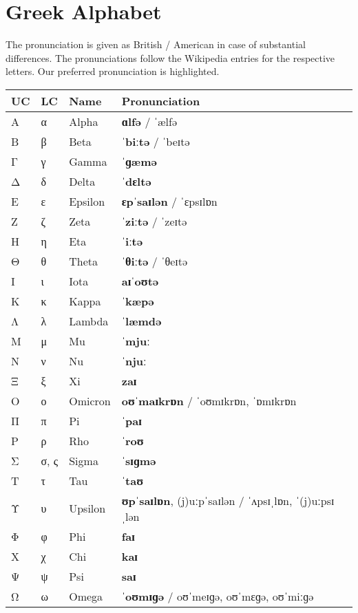 
\section*{Greek Alphabet}

The pronunciation is given as British / American in case of substantial differences.
The pronunciations follow the Wikipedia entries for the respective letters.
Our preferred pronunciation is highlighted.

\begin{center}
  \begin{tabular}{llll}
    \toprule
    \textbf{UC} & \textbf{LC} & \textbf{Name} & \textbf{Pronunciation} \\
    \midrule
    Α & α	   & Alpha   & \textbf{ɑlfə} / ˈælfə \\
    Β & β	   & Beta    & \textbf{ˈbiːtə} / ˈbeɪtə \\
    Γ & γ	   & Gamma   & \textbf{ˈɡæmə} \\
    Δ & δ	   & Delta   & \textbf{ˈdɛltə} \\
    Ε & ε	   & Epsilon & \textbf{ɛpˈsaɪlən} / ˈɛpsɪlɒn \\
    Ζ & ζ	   & Zeta    & \textbf{ˈziːtə} / ˈzeɪtə \\
    Η & η	   & Eta     & \textbf{ˈiːtə} \\
    Θ & θ	   & Theta   & \textbf{ˈθiːtə} / ˈθeɪtə \\
    Ι & ι	   & Iota    & \textbf{aɪˈoʊtə} \\
    Κ & κ	   & Kappa   & \textbf{ˈkæpə} \\
    Λ & λ	   & Lambda  & \textbf{ˈlæmdə} \\
    Μ & μ	   & Mu      & \textbf{ˈmjuː} \\
    Ν & ν	   & Nu      & \textbf{ˈnjuː} \\
    Ξ & ξ	   & Xi      & \textbf{zaɪ} \\
    Ο & ο	   & Omicron & \textbf{oʊˈmaɪkrɒn} / ˈoʊmɪkrɒn, ˈɒmɪkrɒn \\
    Π & π	   & Pi      & \textbf{ˈpaɪ} \\
    Ρ & ρ	   & Rho     & \textbf{ˈroʊ} \\
    Σ & σ, ς & Sigma   & \textbf{ˈsɪɡmə} \\
    Τ & τ	   & Tau     & \textbf{ˈtaʊ} \\
    Υ & υ	   & Upsilon & \textbf{ʊpˈsaɪlɒn}, (j)uːpˈsaɪlən / ˈʌpsɪˌlɒn, ˈ(j)uːpsɪˌlən \\
    Φ & φ	   & Phi     & \textbf{faɪ} \\
    Χ & χ	   & Chi     & \textbf{kaɪ} \\
    Ψ & ψ	   & Psi     & \textbf{saɪ} \\
    Ω & ω	   & Omega   & \textbf{ˈoʊmɪɡə} / oʊˈmeɪɡə, oʊˈmɛɡə, oʊˈmiːɡə \\
    \bottomrule
  \end{tabular}
\end{center}



